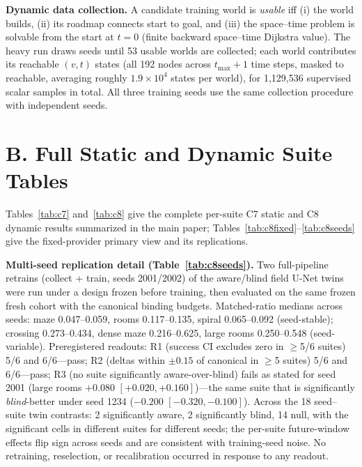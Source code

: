 \documentclass[letterpaper]{article} %
\newcommand{\stage}[1]{\textsc{#1}}
\begin{document}
\textbf{Dynamic data collection.} A candidate training world is \emph{usable} iff (i) the world builds, (ii) its roadmap connects start to goal, and (iii) the space--time problem is solvable from the start at $t{=}0$ (finite backward space--time Dijkstra value). The heavy run draws seeds until 53 usable worlds are collected; each world contributes its reachable $(v,t)$ states (all 192 nodes across $t_{\max}{+}1$ time steps, masked to reachable, averaging roughly $1.9{\times}10^{4}$ states per world), for 1{,}129{,}536 supervised scalar samples in total. All three training seeds use the same collection procedure with independent seeds.

\section{B. Full Static and Dynamic Suite Tables}

Tables~\ref{tab:c7} and~\ref{tab:c8} give the complete per-suite \stage{C7} static and \stage{C8} dynamic results summarized in the main paper; Tables~\ref{tab:c8fixed}--\ref{tab:c8seeds} give the fixed-provider primary view and its replications.

\textbf{Multi-seed replication detail (Table~\ref{tab:c8seeds}).} Two full-pipeline retrains (collect + train, seeds 2001/2002) of the aware/blind field U-Net twins were run under a design frozen before training, then evaluated on the same frozen fresh cohort with the canonical binding budgets. Matched-ratio medians across seeds: maze 0.047--0.059, rooms 0.117--0.135, spiral 0.065--0.092 (seed-stable); crossing 0.273--0.434, dense maze 0.216--0.625, large rooms 0.250--0.548 (seed-variable). Preregistered readouts: R1 (success CI excludes zero in $\geq$5/6 suites) 5/6 and 6/6---pass; R2 (deltas within $\pm 0.15$ of canonical in $\geq$5 suites) 5/6 and 6/6---pass; R3 (no suite significantly aware-over-blind) fails as stated for seed 2001 (large rooms $+0.080$ $[+0.020,+0.160]$)---the same suite that is significantly \emph{blind}-better under seed 1234 ($-0.200$ $[-0.320,-0.100]$). Across the 18 seed--suite twin contrasts: 2 significantly aware, 2 significantly blind, 14 null, with the significant cells in different suites for different seeds; the per-suite future-window effects flip sign across seeds and are consistent with training-seed noise. No retraining, reselection, or recalibration occurred in response to any readout.
\end{document}
